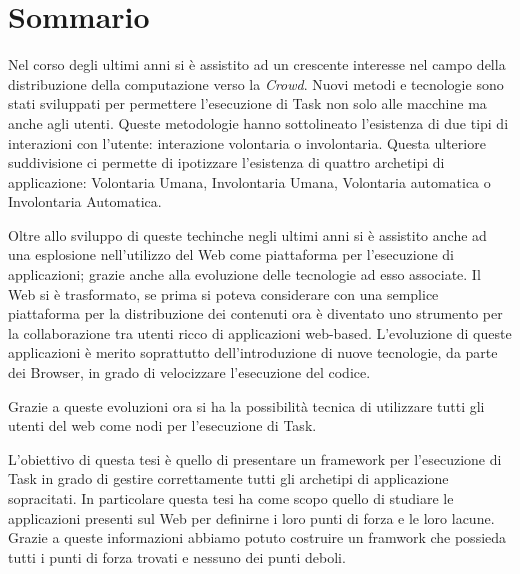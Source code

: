 \cleardoublepage
{}
{}
\begingroup
\let\clearpage\relax
\let\cleardoublepage\relax
\let\cleardoublepage\relax

\chapter*{Sommario}

Nel corso degli ultimi anni si è assistito ad un crescente interesse nel campo
della distribuzione della computazione verso la \emph{Crowd}. Nuovi metodi
e tecnologie sono stati sviluppati per permettere l'esecuzione di Task non solo
alle macchine ma anche agli utenti. Queste metodologie hanno sottolineato
l'esistenza di due tipi di interazioni con l'utente: interazione volontaria
o involontaria. Questa ulteriore suddivisione ci permette di ipotizzare l'esistenza
di quattro archetipi di applicazione: Volontaria Umana, Involontaria Umana, Volontaria
automatica o Involontaria Automatica.

Oltre allo sviluppo di queste techinche negli ultimi anni si è assistito anche
ad una esplosione nell'utilizzo del Web come piattaforma per l'esecuzione di applicazioni; grazie anche alla evoluzione delle tecnologie ad esso associate.
Il Web si è trasformato, se prima si poteva considerare con una semplice piattaforma
per la distribuzione dei contenuti ora è diventato uno strumento per la collaborazione
tra utenti ricco di applicazioni web-based. L'evoluzione di queste applicazioni
è merito soprattutto dell'introduzione di nuove tecnologie, da parte dei Browser,
in grado di velocizzare l'esecuzione del codice.

Grazie a queste evoluzioni ora si ha la possibilità tecnica di utilizzare tutti gli
utenti del web come nodi per l'esecuzione di Task.

L'obiettivo di questa tesi è quello di presentare un framework per l'esecuzione
di Task in grado di gestire correttamente tutti gli archetipi di applicazione
sopracitati. In particolare questa tesi ha come scopo quello di studiare le
applicazioni presenti sul Web per definirne i loro punti di forza e le loro lacune.
Grazie a queste informazioni abbiamo potuto costruire un framwork che possieda
tutti i punti di forza trovati e nessuno dei punti deboli.



\vfill

